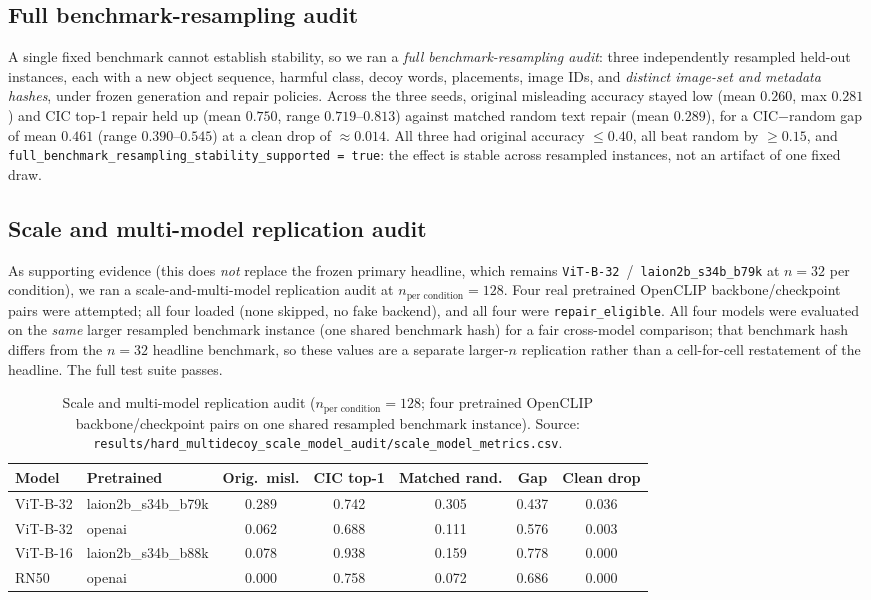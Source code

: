 \documentclass[11pt]{article}
\begin{document}
\subsection{Full benchmark-resampling audit}
A single fixed benchmark cannot establish stability, so we ran a \emph{full
benchmark-resampling audit}: three independently resampled held-out instances, each
with a new object sequence, harmful class, decoy words, placements, image IDs, and
\emph{distinct image-set and metadata hashes}, under frozen generation and repair
policies. Across the three seeds, original misleading accuracy stayed low (mean
$0.260$, max $0.281$) and CIC top-1 repair held up (mean $0.750$, range
$0.719$--$0.813$) against matched random text repair (mean $0.289$), for a CIC$-$random
gap of mean $0.461$ (range $0.390$--$0.545$) at a clean drop of $\approx0.014$. All
three had original accuracy $\le 0.40$, all beat random by $\ge 0.15$, and
\texttt{full\_benchmark\_resampling\_stability\_supported = true}: the effect is stable
across resampled instances, not an artifact of one fixed draw.

\subsection{Scale and multi-model replication audit}
As supporting evidence (this does \emph{not} replace the frozen primary headline,
which remains \texttt{ViT-B-32}~/~\texttt{laion2b\_s34b\_b79k} at $n=32$ per
condition), we ran a scale-and-multi-model replication audit at
$n_{\text{per condition}}=128$. Four real pretrained OpenCLIP backbone/checkpoint
pairs were attempted; all four loaded (none skipped, no fake backend), and all
four were \texttt{repair\_eligible}. All four models were evaluated on the
\emph{same} larger resampled benchmark instance (one shared benchmark hash) for a
fair cross-model comparison; that benchmark hash differs from the $n=32$ headline
benchmark, so these values are a separate larger-$n$ replication rather than a
cell-for-cell restatement of the headline. The full test suite passes.

\begin{table}[t]
\centering
\caption{Scale and multi-model replication audit ($n_{\text{per condition}}=128$;
four pretrained OpenCLIP backbone/checkpoint pairs on one shared resampled
benchmark instance). Source:
\texttt{results/hard\_multidecoy\_scale\_model\_audit/scale\_model\_metrics.csv}.}
\label{tab:scalemodel}
\small
\begin{tabular}{llccccc}
\toprule
Model & Pretrained & Orig.\ misl. & CIC top-1 & Matched rand. & Gap & Clean drop \\
\midrule
ViT-B-32 & laion2b\_s34b\_b79k & 0.289 & 0.742 & 0.305 & 0.437 & 0.036 \\
ViT-B-32 & openai & 0.062 & 0.688 & 0.111 & 0.576 & 0.003 \\
ViT-B-16 & laion2b\_s34b\_b88k & 0.078 & 0.938 & 0.159 & 0.778 & 0.000 \\
RN50 & openai & 0.000 & 0.758 & 0.072 & 0.686 & 0.000 \\
\bottomrule
\end{tabular}
\end{table}
\end{document}
